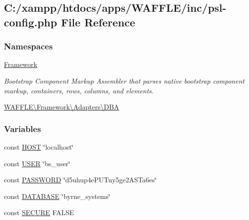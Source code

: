\hypertarget{psl-config_8php}{}\subsection{C\+:/xampp/htdocs/apps/\+W\+A\+F\+F\+L\+E/inc/psl-\/config.php File Reference}
\label{psl-config_8php}
\subsubsection*{Namespaces}
\begin{DoxyCompactItemize}
\item 
 \hyperlink{namespace_framework}{Framework}
\begin{DoxyCompactList}\small\item\em Bootstrap Component Markup Assembler that parses native bootstrap component markup, containers, rows, columns, and elements. \end{DoxyCompactList}\item 
 \hyperlink{namespace_w_a_f_f_l_e_1_1_framework_1_1_adapters_1_1_d_b_a}{W\+A\+F\+F\+L\+E\textbackslash{}\+Framework\textbackslash{}\+Adapters\textbackslash{}\+D\+BA}
\end{DoxyCompactItemize}
\subsubsection*{Variables}
\begin{DoxyCompactItemize}
\item 
const \hyperlink{namespace_w_a_f_f_l_e_1_1_framework_1_1_adapters_1_1_d_b_a_a6768772c01f2d4f111fabd25012e8259}{H\+O\+ST} \char`\"{}localhost\char`\"{}
\item 
const \hyperlink{namespace_w_a_f_f_l_e_1_1_framework_1_1_adapters_1_1_d_b_a_a1bbff5b87a1e3a8d402d50c9fdb4e6e9}{U\+S\+ER} \char`\"{}bs\+\_\+user\char`\"{}
\item 
const \hyperlink{namespace_w_a_f_f_l_e_1_1_framework_1_1_adapters_1_1_d_b_a_a627633cf1f3c4ee60fcc7d025a4039ed}{P\+A\+S\+S\+W\+O\+RD} \char`\"{}d5uhup4e\+P\+U\+Tuy5ge2\+A\+S\+Ta6es\char`\"{}
\item 
const \hyperlink{namespace_w_a_f_f_l_e_1_1_framework_1_1_adapters_1_1_d_b_a_a671e180a0a9486e82d3f3ccb1f4761f6}{D\+A\+T\+A\+B\+A\+SE} \char`\"{}byrne\+\_\+systems\char`\"{}
\item 
const \hyperlink{namespace_w_a_f_f_l_e_1_1_framework_1_1_adapters_1_1_d_b_a_afdb2746446e63b60d3e42dc8777e6aaf}{S\+E\+C\+U\+RE} F\+A\+L\+SE
\end{DoxyCompactItemize}
